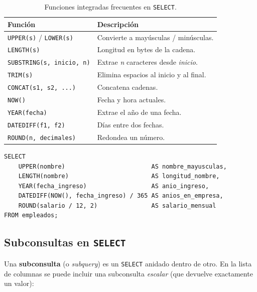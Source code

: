 \begin{table}[H]
\centering
\small
\renewcommand{\arraystretch}{1.4}
\begin{tabularx}{\linewidth}{@{} l X @{}}
\toprule
\textbf{Función} & \textbf{Descripción} \\
\midrule
\texttt{UPPER(s)} / \texttt{LOWER(s)}  & Convierte a mayúsculas / minúsculas. \\
\texttt{LENGTH(s)}                     & Longitud en bytes de la cadena. \\
\texttt{SUBSTRING(s, inicio, n)}       & Extrae \textit{n} caracteres desde \textit{inicio}. \\
\texttt{TRIM(s)}                       & Elimina espacios al inicio y al final. \\
\texttt{CONCAT(s1, s2, ...)}           & Concatena cadenas. \\
\texttt{NOW()}                         & Fecha y hora actuales. \\
\texttt{YEAR(fecha)}                   & Extrae el año de una fecha. \\
\texttt{DATEDIFF(f1, f2)}             & Días entre dos fechas. \\
\texttt{ROUND(n, decimales)}           & Redondea un número. \\
\bottomrule
\end{tabularx}
\caption{Funciones integradas frecuentes en \texttt{SELECT}.}
\label{tab:funciones-select}
\end{table}

\begin{lstlisting}[caption={Uso de funciones de cadena, fecha y número.}]
SELECT
    UPPER(nombre)                        AS nombre_mayusculas,
    LENGTH(nombre)                       AS longitud_nombre,
    YEAR(fecha_ingreso)                  AS anio_ingreso,
    DATEDIFF(NOW(), fecha_ingreso) / 365 AS anios_en_empresa,
    ROUND(salario / 12, 2)               AS salario_mensual
FROM empleados;
\end{lstlisting}

\subsection{Subconsultas en \texttt{SELECT}}

Una \textbf{subconsulta} (o \textit{subquery}) es un \texttt{SELECT}
anidado dentro de otro.
En la lista de columnas se puede incluir una subconsulta
\textit{escalar} (que devuelve exactamente un valor):

